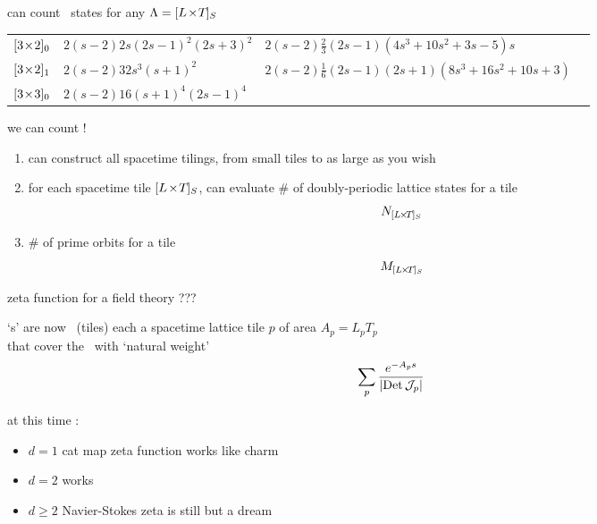 \begin{frame}{can count \catlatt\ states for any $\Lambda={[{L_{}}\!\times\!{T_{}}]_{S_{}}}$}
\begin{center}
{\begin{tabular}{lllr}
${[3\!\times\!2]_{0}}$    & $2({s}-2)2s(2{s}-1)^2 (2{s}+3)^2$
	& $2({s}-2)\frac{2}{3}(2{s}-1)(4{s}^3+10{s}^2+3{s}-5)s$
                                  &  \\
${[3\!\times\!2]_{1}}$  & $2({s}-2)32{s}^3({s}+1)^2$
	& $2 ({s}-2) \frac{1}{6} (2 {s}-1) (2 {s}+1) (8 {s}^3+16 {s}^2+10 {s}+3)$
                                  &  \\
${[3\!\times\!3]_{0}}$    & $2({s}-2)16({s}+1)^4(2{s}-1)^4$
                                  &  \\
\end{tabular}
} %
\end{center}
\end{frame}

\begin{frame}{we can count !}

\begin{enumerate}
  \item can construct all spacetime tilings,
  from small tiles to as large as you wish
  \item for each spacetime tile ${[{L_{}}\!\times\!{T_{}}]_{S_{}}}$,
can evaluate
\# of doubly-periodic {\color{blue}lattice states} for a tile
\[
N_{{[{L_{}}\!\times\!{T_{}}]_{S_{}}}}
\]
  \item
\# of {\color{blue}prime orbits} for a tile
\[
M_{{[{L_{}}\!\times\!{T_{}}]_{S_{}}}}
\]
\end{enumerate}
\end{frame}

\begin{frame}{zeta function for a field theory ???} %
\begin{block}{`\po s' are now \twots\ (tiles)}
each a spacetime lattice tile  $p$ of area $A_p = L_p T_p$\\
that cover the \statesp\ with `natural weight'
\[
\sum_{p} \frac{e^{-A_p s}}
              {\left|\mbox{\rm Det}\,{\cal J}_p\right|}
\]
\end{block}

\vfill
at this time :
\begin{itemize}
\item $d=1$ cat map zeta function works like charm
\item $d=2$ {\catlatt} works
\item $d\geq2$ Navier-Stokes  zeta is still but a dream
\end{itemize}
\end{frame}

